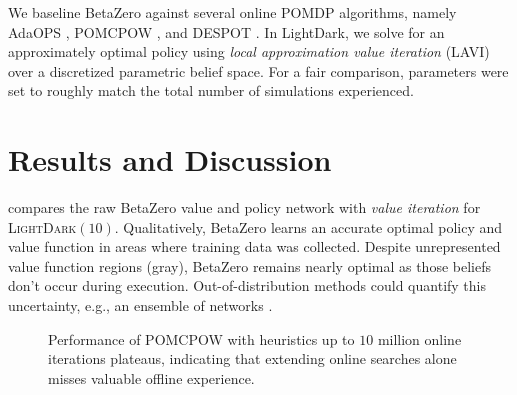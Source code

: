 We baseline BetaZero against several online POMDP algorithms, namely AdaOPS \cite{wu2021adaptive}, POMCPOW \cite{sunberg2018online}, and DESPOT \cite{ye2017despot}.
In LightDark, we solve for an approximately optimal policy using \textit{local approximation value iteration} (LAVI) \cite{dmubook} over a discretized parametric belief space.
For a fair comparison, parameters were set to roughly match the total number of simulations experienced.


\section{Results and Discussion}
 compares the raw BetaZero value and policy network with \textit{value iteration} for \textsc{LightDark}$(10)$.
Qualitatively, BetaZero learns an accurate optimal policy and value function in areas where training data was collected.
Despite unrepresented value function regions (gray), BetaZero remains nearly optimal as those beliefs don't occur during execution.
Out-of-distribution methods could quantify this uncertainty, e.g., an ensemble of networks \cite{salehi2022unified}.


\begin{figure}[t!]
    \centering
    \resizebox{\linewidth}{!}{
        
    }
    \caption{Performance of POMCPOW with heuristics up to $10$ million online iterations plateaus, indicating that extending online searches alone misses valuable offline experience.}
    \label{fig:online}
\end{figure}


